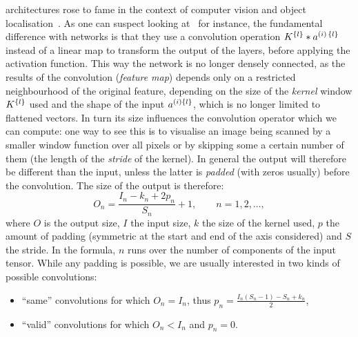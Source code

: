 \cnn architectures rose to fame in the context of computer vision and object localisation~\cite{Tompson:2015:EfficientObjectLocalization}.
As one can suspect looking at~ for instance, the fundamental difference with \fc networks is that they use a convolution operation $K^{\qty{l}} * a^{(i)\, \qty{l}}$ instead of a linear map to transform the output of the layers, before applying the activation function.\footnotemark{}
This way the network is no longer densely connected, as the results of the convolution (\textit{feature map}) depends only on a restricted neighbourhood of the original feature, depending on the size of the \textit{kernel} window $K^{\qty{l}}$ used and the shape of the input $a^{(i) \qty{l}}$, which is no longer limited to flattened vectors.
In turn its size influences the convolution operator which we can compute: one way to see this is to visualise an image being scanned by a smaller window function over all pixels or by skipping some a certain number of them (the length of the \textit{stride} of the kernel).
In general the output will therefore be different than the input, unless the latter is \textit{padded} (with zeros usually) before the convolution. The size of the output is therefore:
\begin{equation}
  O_n = \frac{I_n - k_n + 2 p_n}{S_n} + 1, \qquad n = 1, 2, \dots,
\end{equation}
where $O$ is the output size, $I$ the input size, $k$ the size of the kernel used, $p$ the amount of padding (symmetric at the start and end of the axis considered) and $S$ the stride.
In the formula, $n$ runs over the number of components of the input tensor.
While any padding is possible, we are usually interested in two kinds of possible convolutions:
\begin{itemize}
  \item ``same'' convolutions for which $O_n = I_n$, thus $p_n = \frac{I_n ( S_n - 1 ) - S_n + k_n}{2}$,

  \item ``valid'' convolutions for which $O_n < I_n$ and $p_n = 0$.
\end{itemize}

